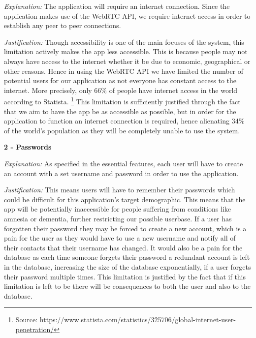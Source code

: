 \textit{Explanation:}
The application will require an internet connection. Since the
application makes use of the WebRTC API, we require internet 
access in order to establish any peer to peer connections.
\vspace{0.1cm}

\textit{Justification:}
Though accessibility is one of the main focuses of the system,
this limitation actively makes the app less accessible. This
is because people may not always have access to the internet 
whether it be due to economic, geographical or other reasons.
Hence in using the WebRTC API we have limited the number of 
potential users for our application as not everyone has 
constant access to the internet. More precisely, only 66\% of 
people have internet access in the world according to Statista.
\footnote{Source: \url{https://www.statista.com/statistics/325706/global-internet-user-penetration/}}
This limitation is sufficiently justified through the fact that
we aim to have the app be as accessible as possible, but in 
order for the application to function an internet connection is
required, hence alienating 34\% of the world's population as they
will be completely unable to use the system. \\ \vspace{0.2cm}

\textsf{\bfseries 2 - Passwords} \\ \vspace{0.1cm}

\textit{Explanation:}
As specified in the essential features, each user will have to 
create an account with a set username and password in order to 
use the application. \vspace{0.1cm}

\textit{Justification:} This means users will have to remember 
their passwords which could be difficult for this application's
target demographic. This means that the app will be
potentially inaccessible for people suffering from conditions
like amnesia or dementia, further restricting our possible 
userbase. If a user has forgotten their password they
may be forced to create a new account, which is a pain for the 
user as they would have to use a new username and notify all of
their contacts that their username has changed. It would also 
be a pain for the database as each time someone forgets their 
password a redundant account is left in the database, 
increasing the size of the database exponentially, if a user 
forgets their password multiple times. This limitation is 
justified by the fact that if this limitation is left to be
there will be consequences to both the user and also to the 
database. \\ \vspace{0.2cm}

